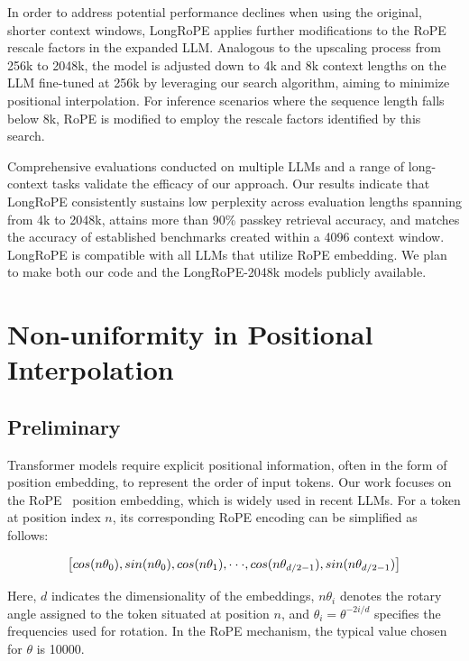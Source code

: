 In order to address potential performance declines when using the original, shorter context windows, {LongRoPE} applies further modifications to the RoPE rescale factors in the expanded LLM. Analogous to the upscaling process from 256k to 2048k, the model is adjusted down to 4k and 8k context lengths on the LLM fine-tuned at 256k by leveraging our search algorithm, aiming to minimize positional interpolation. For inference scenarios where the sequence length falls below 8k, RoPE is modified to employ the rescale factors identified by this search.

Comprehensive evaluations conducted on multiple LLMs and a range of long-context tasks validate the efficacy of our approach. Our results indicate that LongRoPE consistently sustains low perplexity across evaluation lengths spanning from 4k to 2048k, attains more than 90\% passkey retrieval accuracy, and matches the accuracy of established benchmarks created within a 4096 context window. LongRoPE is compatible with all LLMs that utilize RoPE embedding. We plan to make both our code and the LongRoPE-2048k models publicly available.

\section{Non-uniformity in Positional Interpolation}
\label{sec:analysis}

\subsection{Preliminary}

Transformer models require explicit positional information, often in the form of position embedding, to represent the order of input tokens. Our work focuses on the RoPE~\cite{rope} position embedding, which is widely used in recent  LLMs. For a token at position index $n$, its corresponding RoPE encoding can be simplified as follows:

\begin{equation}
		\fontsize{7.8}{7.8} \selectfont
	\label{eq:rope}
	\left[ cos(n\theta_0), sin(n\theta_0), cos(n\theta_1), \cdot\cdot\cdot, cos(n\theta_{d/2-1}), sin(n\theta_{d/2-1}) \right]   
\end{equation}

Here, $d$ indicates the dimensionality of the embeddings, $n\theta_i$ denotes the rotary angle assigned to the token situated at position $n$, and $\theta_i = \theta^{-2i/d}$ specifies the frequencies used for rotation. In the RoPE mechanism, the typical value chosen for $\theta$ is 10000.

